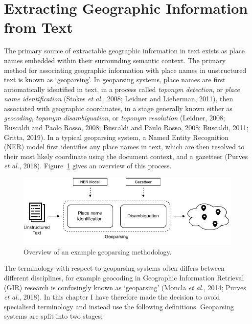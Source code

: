 \documentclass[
  letterpaper,
  11pt,
  english,
  onehalfspacing,
  headsepline]{MastersDoctoralThesis}
\begin{document}
\hypertarget{sec-extract}{%
\section{Extracting Geographic Information from
Text}\label{sec-extract}}

The primary source of extractable geographic information in text exists
as place names embedded within their surrounding semantic context. The
primary method for associating geographic information with place names
in unstructured text is known as `geoparsing'. In geoparsing systems,
place names are first automatically identified in text, in a process
called \emph{toponym detection}, or \emph{place name identification}
(Stokes \emph{et al.}, 2008; Leidner and Lieberman, 2011), then
associated with geographic coordinates, in a stage generally known
either as \emph{geocoding}, \emph{toponym disambiguation}, or
\emph{toponym resolution} (Leidner, 2008; Buscaldi and Paolo Rosso,
2008; Buscaldi and Paulo Rosso, 2008; Buscaldi, 2011; Gritta, 2019). In
a typical geoparsing system, a Named Entity Recognition (NER) model
first identifies any place names in text, which are then resolved to
their most likely coordinate using the document context, and a gazetteer
(Purves \emph{et al.}, 2018). Figure~\ref{fig-geoparsing} gives an
overview of this process.

\begin{figure}

{\centering \includegraphics{02_literature/./02_figures/geoparsing.pdf}

}

\caption{\label{fig-geoparsing}Overview of an example geoparsing
methodology.}

\end{figure}

The terminology with respect to geoparsing systems often differs between
different disciplines, for example geocoding in Geographic Information
Retrieval (GIR) research is confusingly known as `geoparsing' (Moncla
\emph{et al.}, 2014; Purves \emph{et al.}, 2018). In this chapter I have
therefore made the decision to avoid specialised terminology and instead
use the following definitions. Geoparsing systems are split into two
stages;
\end{document}
